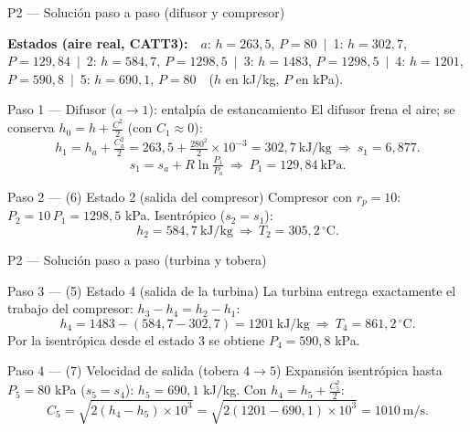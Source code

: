 \documentclass[aspectratio=169,10pt]{beamer}
\begin{document}
\begin{frame}{P2 --- Solución paso a paso (difusor y compresor)}
\begin{cardnota}[\faTable]
{\scriptsize\textbf{Estados (aire real, CATT3):}\ \ $a$: $h{=}263{,}5$, $P{=}80$\ $\vert$\ 1: $h{=}302{,}7$, $P{=}129{,}84$\ $\vert$\ 2: $h{=}584{,}7$, $P{=}1298{,}5$\ $\vert$\ 3: $h{=}1483$, $P{=}1298{,}5$\ $\vert$\ 4: $h{=}1201$, $P{=}590{,}8$\ $\vert$\ 5: $h{=}690{,}1$, $P{=}80$\ \ ($h$ en kJ/kg, $P$ en kPa).}
\end{cardnota}
\vspace{1.2mm}
\begin{cardgear}{Paso 1 --- Difusor ($a\to1$): entalpía de estancamiento}{\faSuperscript}
El difusor frena el aire; se conserva $h_0=h+\tfrac{C^2}{2}$ (con $C_1\approx0$):
$$h_1=h_a+\tfrac{C_a^2}{2}=263{,}5+\tfrac{280^2}{2}\times10^{-3}=302{,}7\ \text{kJ/kg}\ \Rightarrow\ s_1=6{,}877.$$
$$s_1=s_a+R\ln\!\tfrac{P_1}{P_a}\ \Rightarrow\ P_1=129{,}84\ \text{kPa}.$$
\end{cardgear}
\vspace{1.1mm}
\begin{cardidea}{Paso 2 --- (6) Estado 2 (salida del compresor)}{\faListOl}
Compresor con $r_p=10$: $P_2=10\,P_1=1298{,}5$ kPa. Isentrópico ($s_2=s_1$):
$$h_2=584{,}7\ \text{kJ/kg}\ \Rightarrow\ T_2=305{,}2\,^\circ\text{C}.$$
\end{cardidea}
\end{frame}

\begin{frame}{P2 --- Solución paso a paso (turbina y tobera)}
\begin{cardgear}{Paso 3 --- (5) Estado 4 (salida de la turbina)}{\faSuperscript}
La turbina entrega exactamente el trabajo del compresor: $h_3-h_4=h_2-h_1$:
$$h_4=1483-(584{,}7-302{,}7)=1201\ \text{kJ/kg}\ \Rightarrow\ T_4=861{,}2\,^\circ\text{C}.$$
Por la isentrópica desde el estado 3 se obtiene $P_4=590{,}8$ kPa.
\end{cardgear}
\vspace{1.2mm}
\begin{cardidea}{Paso 4 --- (7) Velocidad de salida (tobera $4\to5$)}{\faListOl}
Expansión isentrópica hasta $P_5=80$ kPa ($s_5=s_4$): $h_5=690{,}1$ kJ/kg. Con $h_4=h_5+\tfrac{C_5^2}{2}$:
$$C_5=\sqrt{2(h_4-h_5)\times10^3}=\sqrt{2(1201-690{,}1)\times10^3}=1010\ \text{m/s}.$$
\end{cardidea}
\end{frame}
\end{document}
